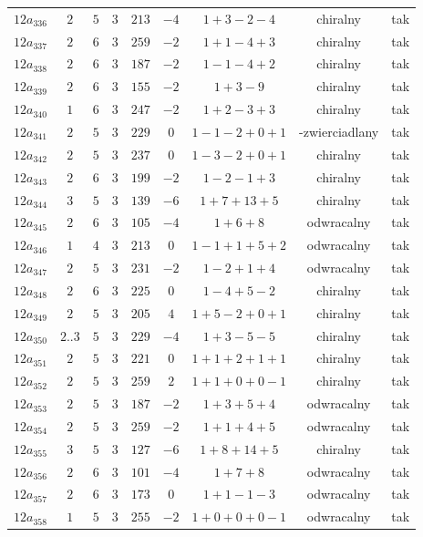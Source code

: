 \begin{longtable}{ccccccccc}
$12a_{336}$ & $2$ & $5$ & $3$ & $213$ & $-4$ & $1+3-2-4$ & chiralny & tak \\
$12a_{337}$ & $2$ & $6$ & $3$ & $259$ & $-2$ & $1+1-4+3$ & chiralny & tak \\
$12a_{338}$ & $2$ & $6$ & $3$ & $187$ & $-2$ & $1-1-4+2$ & chiralny & tak \\
$12a_{339}$ & $2$ & $6$ & $3$ & $155$ & $-2$ & $1+3-9$ & chiralny & tak \\
$12a_{340}$ & $1$ & $6$ & $3$ & $247$ & $-2$ & $1+2-3+3$ & chiralny & tak \\
$12a_{341}$ & $2$ & $5$ & $3$ & $229$ & $0$ & $1-1-2+0+1$ & -zwierciadlany & tak \\
$12a_{342}$ & $2$ & $5$ & $3$ & $237$ & $0$ & $1-3-2+0+1$ & chiralny & tak \\
$12a_{343}$ & $2$ & $6$ & $3$ & $199$ & $-2$ & $1-2-1+3$ & chiralny & tak \\
$12a_{344}$ & $3$ & $5$ & $3$ & $139$ & $-6$ & $1+7+13+5$ & chiralny & tak \\
$12a_{345}$ & $2$ & $6$ & $3$ & $105$ & $-4$ & $1+6+8$ & odwracalny & tak \\
$12a_{346}$ & $1$ & $4$ & $3$ & $213$ & $0$ & $1-1+1+5+2$ & odwracalny & tak \\
$12a_{347}$ & $2$ & $5$ & $3$ & $231$ & $-2$ & $1-2+1+4$ & odwracalny & tak \\
$12a_{348}$ & $2$ & $6$ & $3$ & $225$ & $0$ & $1-4+5-2$ & chiralny & tak \\
$12a_{349}$ & $2$ & $5$ & $3$ & $205$ & $4$ & $1+5-2+0+1$ & chiralny & tak \\
$12a_{350}$ & $2..3$ & $5$ & $3$ & $229$ & $-4$ & $1+3-5-5$ & chiralny & tak \\
$12a_{351}$ & $2$ & $5$ & $3$ & $221$ & $0$ & $1+1+2+1+1$ & chiralny & tak \\
$12a_{352}$ & $2$ & $5$ & $3$ & $259$ & $2$ & $1+1+0+0-1$ & chiralny & tak \\
$12a_{353}$ & $2$ & $5$ & $3$ & $187$ & $-2$ & $1+3+5+4$ & odwracalny & tak \\
$12a_{354}$ & $2$ & $5$ & $3$ & $259$ & $-2$ & $1+1+4+5$ & odwracalny & tak \\
$12a_{355}$ & $3$ & $5$ & $3$ & $127$ & $-6$ & $1+8+14+5$ & chiralny & tak \\
$12a_{356}$ & $2$ & $6$ & $3$ & $101$ & $-4$ & $1+7+8$ & odwracalny & tak \\
$12a_{357}$ & $2$ & $6$ & $3$ & $173$ & $0$ & $1+1-1-3$ & odwracalny & tak \\
$12a_{358}$ & $1$ & $5$ & $3$ & $255$ & $-2$ & $1+0+0+0-1$ & odwracalny & tak \\

\end{longtable}
